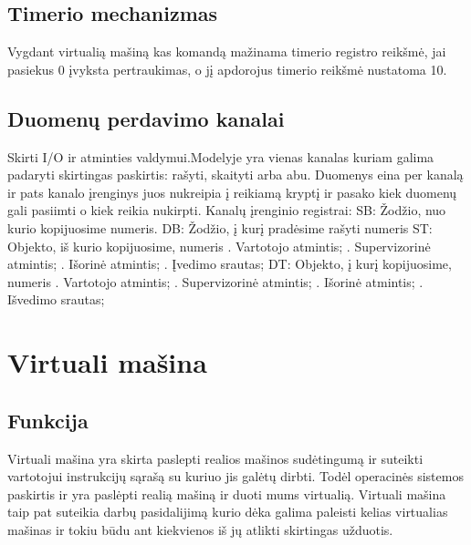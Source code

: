 \documentclass[oneside]{VUMIFPSkursinis}
\begin{document}
\subsection{Timerio mechanizmas}
Vygdant virtualią mašiną kas komandą mažinama timerio registro reikšmė, jai pasiekus 0 įvyksta pertraukimas, o jį apdorojus timerio reikšmė nustatoma 10.
\subsection{Duomenų perdavimo kanalai}
Skirti I/O ir atminties valdymui.Modelyje yra vienas kanalas kuriam galima padaryti skirtingas paskirtis: rašyti, skaityti arba abu. Duomenys eina per kanalą ir pats kanalo įrenginys juos nukreipia į reikiamą kryptį ir pasako kiek duomenų gali pasiimti o kiek reikia nukirpti. Kanalų įrenginio registrai:\newline
\newline SB: Žodžio, nuo kurio kopijuosime numeris.
\newline DB: Žodžio, į kurį pradėsime rašyti numeris
\newline ST: Objekto, iš kurio kopijuosime, numeris
. Vartotojo atmintis;
. Supervizorinė atmintis;
. Išorinė atmintis;
. Įvedimo srautas;
\newline DT: Objekto, į kurį kopijuosime, numeris
. Vartotojo atmintis;
. Supervizorinė atmintis;
. Išorinė atmintis;
. Išvedimo srautas; 

\section{Virtuali mašina}

\subsection{Funkcija}
Virtuali mašina yra skirta paslepti realios mašinos sudėtingumą ir suteikti vartotojui instrukcijų sąrašą su kuriuo jis galėtų dirbti. Todėl operacinės sistemos paskirtis ir yra paslėpti realią mašiną ir duoti mums virtualią. Virtuali mašina taip pat suteikia darbų pasidalijimą kurio dėka galima paleisti kelias virtualias mašinas ir tokiu būdu ant kiekvienos iš jų atlikti skirtingas užduotis.
\end{document}
